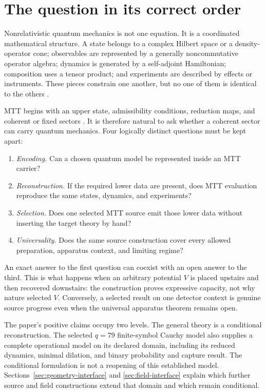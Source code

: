 \documentclass[11pt]{article}
\theoremstyle{definition}
\theoremstyle{remark}
\let\MTToriginalitem\item
\renewcommand{\item}{\par\MTToriginalitem}
\begin{document}
\tableofcontents

\section{The question in its correct order}
\label{sec:question}

Nonrelativistic quantum mechanics is not one equation.  It is a coordinated
mathematical structure.  A state belongs to a complex Hilbert space or a
density-operator cone; observables are represented by a generally
noncommutative operator algebra; dynamics is generated by a self-adjoint
Hamiltonian; composition uses a tensor product; and experiments are
described by effects or instruments.  These pieces constrain one another,
but no one of them is identical to the others
\cite{ReedSimon1972,Kato1995,DaviesLewis1970}.

MTT begins with an upper state, admissibility conditions, reduction maps,
and coherent or fixed sectors \cite{MTTFoundation2026}.  It is therefore
natural to ask whether a coherent sector can carry quantum mechanics.  Four
logically distinct questions must be kept apart:
\begin{enumerate}[leftmargin=2em]
\item \emph{Encoding.}  Can a chosen quantum model be represented inside an
      MTT carrier?
\item \emph{Reconstruction.}  If the required lower data are present, does
      MTT evaluation reproduce the same states, dynamics, and experiments?
\item \emph{Selection.}  Does one selected MTT source emit those lower data
      without inserting the target theory by hand?
\item \emph{Universality.}  Does the same source construction cover every
      allowed preparation, apparatus context, and limiting regime?
\end{enumerate}

An exact answer to the first question can coexist with an open answer to the
third.  This is what happens when an arbitrary potential \(V\) is placed
upstairs and then recovered downstairs: the construction proves expressive
capacity, not why nature selected \(V\).  Conversely, a selected result on
one detector context is genuine source progress even when the universal
apparatus theorem remains open.

The paper's positive claims occupy two levels. The general theory is a
conditional reconstruction. The selected \(q=79\) finite-symbol Cauchy model
also supplies a complete operational model on its declared domain, including
its reduced dynamics, minimal dilation, and binary probability and capture
result. The conditional formulation is not a reopening of this established
model. Sections~\ref{sec:geometry-interface} and \ref{sec:field-interface}
explain which further source and field constructions extend that domain and
which remain conditional.
\end{document}
